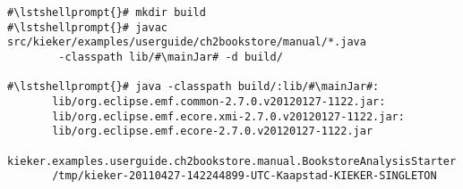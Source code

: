 \begin{lstlisting}[caption=Commands to compile and run the analysis under \UnixLikeSystems{},label=lst:bookstoreAnalysisStarterLinux] 			
#\lstshellprompt{}# mkdir build
#\lstshellprompt{}# javac src/kieker/examples/userguide/ch2bookstore/manual/*.java 
        -classpath lib/#\mainJar# -d build/

#\lstshellprompt{}# java -classpath build/:lib/#\mainJar#:
       lib/org.eclipse.emf.common-2.7.0.v20120127-1122.jar:
       lib/org.eclipse.emf.ecore.xmi-2.7.0.v20120127-1122.jar:
       lib/org.eclipse.emf.ecore-2.7.0.v20120127-1122.jar
       kieker.examples.userguide.ch2bookstore.manual.BookstoreAnalysisStarter 
       /tmp/kieker-20110427-142244899-UTC-Kaapstad-KIEKER-SINGLETON
\end{lstlisting}	